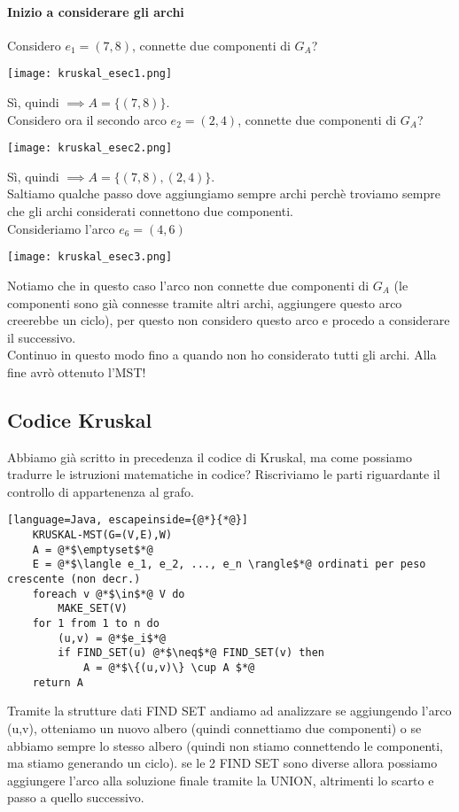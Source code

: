 \paragraph*{Inizio a considerare gli archi} Considero $e_1 = (7,8)$, connette due componenti di
$G_A$?
\begin{center}
    \texttt{[image: kruskal\_esec1.png]}
\end{center}
Sì, quindi $\implies A = \{(7,8)\}$.\\
Considero ora il secondo arco $e_2 = (2,4)$, connette due componenti di $G_A$?
\begin{center}
    \texttt{[image: kruskal\_esec2.png]}
\end{center}
Sì, quindi $\implies A = \{(7,8), (2,4)\}$.\\
Saltiamo qualche passo dove aggiungiamo sempre archi perchè troviamo sempre che
gli archi considerati connettono due componenti.\\
Consideriamo l'arco $e_6=(4,6)$
\begin{center}
    \texttt{[image: kruskal\_esec3.png]}
\end{center}
Notiamo che in questo caso l'arco non connette due componenti di $G_A$ (le 
componenti sono già connesse tramite altri archi, aggiungere questo arco creerebbe
un ciclo), per questo non considero questo
arco e procedo a considerare il successivo.\\
Continuo in questo modo fino a quando non ho considerato tutti gli archi. Alla fine
avrò ottenuto l'MST!
\subsection{Codice Kruskal}
Abbiamo già scritto in precedenza il codice di Kruskal, ma come possiamo tradurre le istruzioni
matematiche in codice? Riscriviamo le parti riguardante il controllo di appartenenza al grafo.
\begin{lstlisting}[language=Java, escapeinside={@*}{*@}]
    KRUSKAL-MST(G=(V,E),W)
    A = @*$\emptyset$*@
    E = @*$\langle e_1, e_2, ..., e_n \rangle$*@ ordinati per peso crescente (non decr.)
    foreach v @*$\in$*@ V do
        MAKE_SET(V)
    for 1 from 1 to n do
        (u,v) = @*$e_i$*@
        if FIND_SET(u) @*$\neq$*@ FIND_SET(v) then
            A = @*$\{(u,v)\} \cup A $*@
    return A  
\end{lstlisting}
Tramite la strutture dati FIND SET andiamo ad analizzare se aggiungendo l'arco (u,v), otteniamo
un nuovo albero (quindi connettiamo due componenti) o se abbiamo sempre lo stesso albero (quindi non stiamo
connettendo le componenti, ma stiamo generando un ciclo). se le 2 FIND SET sono diverse allora
possiamo aggiungere l'arco alla soluzione finale tramite la UNION,
altrimenti lo scarto e passo a quello successivo.
